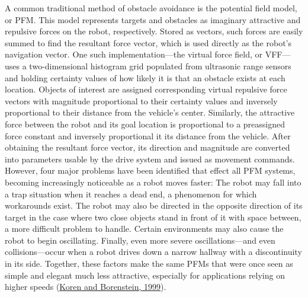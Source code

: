 \documentclass[12pt]{report}
\begin{document}
A common traditional method of obstacle avoidance is the potential field model, or PFM.  This model represents targets and obstacles as imaginary attractive and repulsive forces on the robot, respectively.  Stored as vectors, such forces are easily summed to find the resultant force vector, which is used directly as the robot's navigation vector.  One such implementation---the virtual force field, or VFF---uses a two-dimensional histogram grid populated from ultrasonic range sensors and holding certainty values of how likely it is that an obstacle exists at each location.  Objects of interest are assigned corresponding virtual repulsive force vectors with magnitude proportional to their certainty values and inversely proportional to their distance from the vehicle's center.  Similarly, the attractive force between the robot and its goal location is proportional to a preassigned force constant and inversely proportional it its distance from the vehicle.  After obtaining the resultant force vector, its direction and magnitude are converted into parameters usable by the drive system and issued as movement commands.  However, four major problems have been identified that effect all PFM systems, becoming increasingly noticeable as a robot moves faster:  The robot may fall into a trap situation when it reaches a dead end, a phenomenon for which workarounds exist.  The robot may also be directed in the opposite direction of its target in the case where two close objects stand in front of it with space between, a more difficult problem to handle.  Certain environments may also cause the robot to begin oscillating.  Finally, even more severe oscillations---and even collisions---occur when a robot drives down a narrow hallway with a discontinuity in its side.  Together, these factors make the same PFMs that were once seen as simple and elegant much less attractive, especially for applications relying on higher speeds (\hyperref[bib:koren]{Koren and Borenstein, 1999}).
\end{document}
